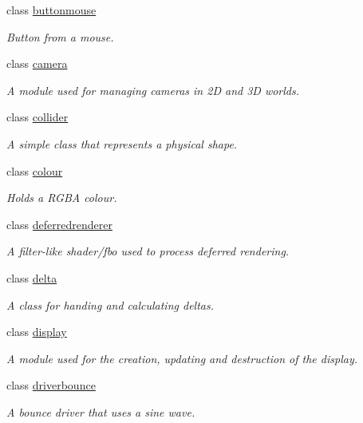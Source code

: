 \begin{DoxyCompactItemize}
class \hyperlink{classflounder_1_1buttonmouse}{buttonmouse}
\begin{DoxyCompactList}\small\item\em Button from a mouse. \end{DoxyCompactList}\item 
class \hyperlink{classflounder_1_1camera}{camera}
\begin{DoxyCompactList}\small\item\em A module used for managing cameras in 2D and 3D worlds. \end{DoxyCompactList}\item 
class \hyperlink{classflounder_1_1collider}{collider}
\begin{DoxyCompactList}\small\item\em A simple class that represents a physical shape. \end{DoxyCompactList}\item 
class \hyperlink{classflounder_1_1colour}{colour}
\begin{DoxyCompactList}\small\item\em Holds a R\+G\+BA colour. \end{DoxyCompactList}\item 
class \hyperlink{classflounder_1_1deferredrenderer}{deferredrenderer}
\begin{DoxyCompactList}\small\item\em A filter-\/like shader/fbo used to process deferred rendering. \end{DoxyCompactList}\item 
class \hyperlink{classflounder_1_1delta}{delta}
\begin{DoxyCompactList}\small\item\em A class for handing and calculating deltas. \end{DoxyCompactList}\item 
class \hyperlink{classflounder_1_1display}{display}
\begin{DoxyCompactList}\small\item\em A module used for the creation, updating and destruction of the display. \end{DoxyCompactList}\item 
class \hyperlink{classflounder_1_1driverbounce}{driverbounce}
\begin{DoxyCompactList}\small\item\em A bounce driver that uses a sine wave. \end{DoxyCompactList}\item 

\end{DoxyCompactItemize}
